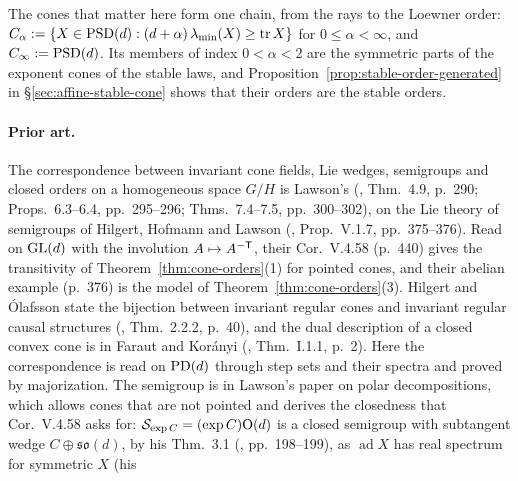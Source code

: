 The cones that matter here form one chain, from the rays to the Loewner order:
$C_\alpha := \{X \in \mathrm{PSD}(d) : (d+\alpha)\,\lambda_{\min}(X) \ge \operatorname{tr} X\}$ for $0 \le \alpha < \infty$, and
$C_\infty := \mathrm{PSD}(d)$. Its members of index $0 < \alpha < 2$ are the symmetric parts of the exponent
cones of the stable laws, and Proposition~\ref{prop:stable-order-generated} in \S\ref{sec:affine-stable-cone} shows that
their orders are the stable orders.

\paragraph{Prior art.} The correspondence between invariant cone fields, Lie wedges, semigroups and
closed orders on a homogeneous space $G/H$ is Lawson's (, Thm.~4.9, p.~290;
Props.~6.3--6.4, pp.~295--296; Thms.~7.4--7.5, pp.~300--302), on the Lie theory of semigroups of
Hilgert, Hofmann and Lawson (, Prop.~V.1.7, pp.~375--376). Read on $\mathrm{GL}(d)$
with the involution $A \mapsto A^{-\mathsf{T}}$, their Cor.~V.4.58 (p.~440) gives the transitivity of
Theorem~\ref{thm:cone-orders}(1) for pointed cones, and their abelian example (p.~376) is the model of
Theorem~\ref{thm:cone-orders}(3). Hilgert and \'Olafsson state the bijection between invariant regular
cones and invariant regular causal structures (, Thm.~2.2.2, p.~40), and the dual
description of a closed convex cone is in Faraut and Kor\'anyi (,
Thm.~I.1.1, p.~2).
Here the correspondence is read on $\mathrm{PD}(d)$ through step sets and their spectra and proved by
majorization. The semigroup is in Lawson's paper on polar decompositions, which allows cones that are
not pointed and derives the closedness that Cor.~V.4.58 asks for: $\mathcal S_{\exp C} = (\exp C)\mathrm{O}(d)$ is a
closed semigroup with subtangent wedge $C \oplus \mathfrak{so}(d)$, by his Thm.~3.1
(, pp.~198--199), as $\operatorname{ad}X$ has real spectrum for symmetric $X$ (his
